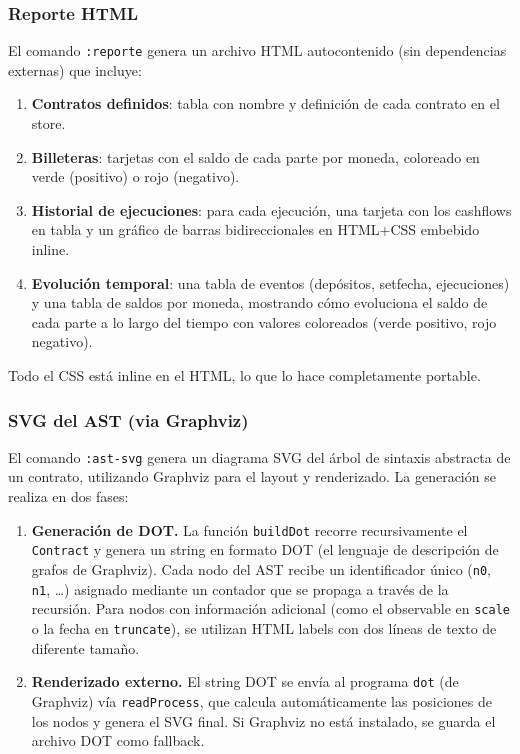 \documentclass[a4paper, 12pt]{article}
\begin{document}
\subsubsection{Reporte HTML}

El comando \texttt{:reporte} genera un archivo HTML autocontenido (sin dependencias externas) que incluye:

\begin{enumerate}[nosep]
    \item \textbf{Contratos definidos}: tabla con nombre y definición de cada contrato en el store.
    \item \textbf{Billeteras}: tarjetas con el saldo de cada parte por moneda, coloreado en verde (positivo) o rojo (negativo).
    \item \textbf{Historial de ejecuciones}: para cada ejecución, una tarjeta con los cashflows en tabla y un gráfico de barras bidireccionales en HTML+CSS embebido inline.
    \item \textbf{Evolución temporal}: una tabla de eventos (depósitos, setfecha, ejecuciones) y una tabla de saldos por moneda, mostrando cómo evoluciona el saldo de cada parte a lo largo del tiempo con valores coloreados (verde positivo, rojo negativo).
\end{enumerate}

Todo el CSS está inline en el HTML, lo que lo hace completamente portable.

\subsubsection{SVG del AST (via Graphviz)}

El comando \texttt{:ast-svg} genera un diagrama SVG del árbol de sintaxis abstracta de un contrato, utilizando Graphviz\cite{graphviz} para el layout y renderizado. La generación se realiza en dos fases:

\begin{enumerate}[nosep]
    \item \textbf{Generación de DOT.} La función \texttt{buildDot} recorre recursivamente el \texttt{Contract} y genera un string en formato DOT (el lenguaje de descripción de grafos de Graphviz). Cada nodo del AST recibe un identificador único (\texttt{n0}, \texttt{n1}, \dots) asignado mediante un contador que se propaga a través de la recursión. Para nodos con información adicional (como el observable en \texttt{scale} o la fecha en \texttt{truncate}), se utilizan HTML labels con dos líneas de texto de diferente tamaño.
    \item \textbf{Renderizado externo.} El string DOT se envía al programa \texttt{dot} (de Graphviz) vía \texttt{readProcess}, que calcula automáticamente las posiciones de los nodos y genera el SVG final. Si Graphviz no está instalado, se guarda el archivo DOT como fallback.
\end{enumerate}
\end{document}
